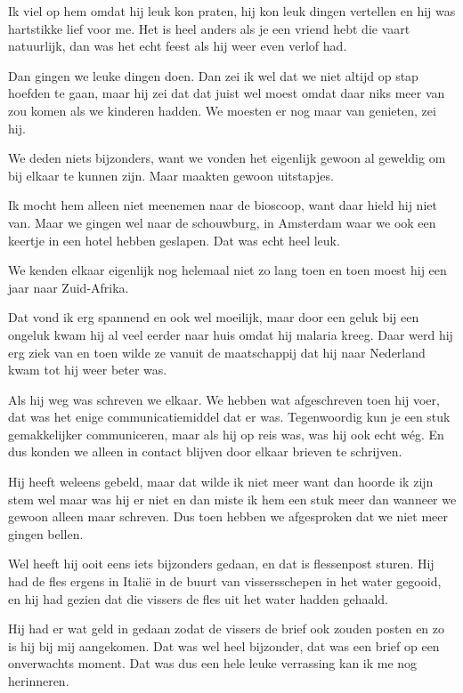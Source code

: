Ik viel op hem omdat hij leuk kon praten, hij kon leuk dingen vertellen en hij was hartstikke lief voor me. Het is heel anders als je een vriend hebt die vaart natuurlijk, dan was het echt feest als hij weer even verlof had.

Dan gingen we leuke dingen doen. Dan zei ik wel dat we niet altijd op stap hoefden te gaan, maar hij zei dat dat juist wel moest omdat daar niks meer van zou komen als we kinderen hadden. We moesten er nog maar van genieten, zei hij.

We deden niets bijzonders, want we vonden het eigenlijk gewoon al geweldig om bij elkaar te kunnen zijn. Maar maakten gewoon uitstapjes. 

Ik mocht hem alleen niet meenemen naar de bioscoop, want daar hield hij niet van. Maar we gingen wel naar de schouwburg, in Amsterdam waar we ook een keertje in een hotel hebben geslapen. Dat was echt heel leuk.

We kenden elkaar eigenlijk nog helemaal niet zo lang toen en toen moest hij een jaar naar Zuid-Afrika.

Dat vond ik erg spannend en ook wel moeilijk, maar door een geluk bij een ongeluk kwam hij al veel eerder naar huis omdat hij malaria kreeg. Daar werd hij erg ziek van en toen wilde ze vanuit de maatschappij dat hij naar Nederland kwam tot hij weer beter was.

Als hij weg was schreven we elkaar. We hebben wat afgeschreven toen hij voer, dat was het enige communicatiemiddel dat er was. Tegenwoordig kun je een stuk gemakkelijker communiceren, maar als hij op reis was, was hij ook echt w\'{e}g. En dus konden we alleen in contact blijven door elkaar brieven te schrijven. 

Hij heeft weleens gebeld, maar dat wilde ik niet meer want dan hoorde ik zijn stem wel maar was hij er niet en dan miste ik hem een stuk meer dan wanneer we gewoon alleen maar schreven. Dus toen hebben we afgesproken dat we niet meer gingen bellen. 

Wel heeft hij ooit eens iets bijzonders gedaan, en dat is flessenpost sturen. Hij had de fles ergens in Itali\"{e} in de buurt van vissersschepen in het water gegooid, en hij had gezien dat die vissers de fles uit het water hadden gehaald. 

Hij had er wat geld in gedaan zodat de vissers de brief ook zouden posten en zo is hij bij mij aangekomen. Dat was wel heel bijzonder, dat was een brief op een onverwachts moment. Dat was dus een hele leuke verrassing kan ik me nog herinneren.

